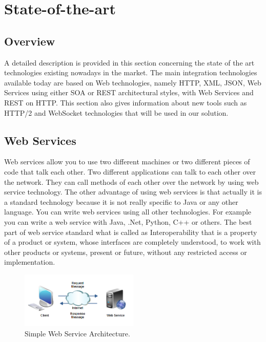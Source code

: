 \chapter{State-of-the-art}
\label{chapter:stateofart}

\section{Overview}
\label{section:overview}
A detailed description is provided in this section concerning the state of the art technologies existing nowadays in the market.  The main integration technologies available today are based on Web technologies, namely HTTP, XML, JSON, Web Services using either SOA or REST architectural styles, with Web Services and REST on HTTP. This section also gives information about new tools such as HTTP/2 and WebSocket technologies that will be used in our solution.
\section{Web Services}
\label{section:webservices}

Web services allow you to use two different machines or two different pieces of code that talk each other. Two different applications can talk to each other over the network. They can call methods of each other over the network by using web service technology. The other advantage of using web services is that actually it is a standard technology because it is not really specific to Java or any other language. You can write web services using all other technologies. For example you can write a web service with Java, .Net, Python, C++ or others. The best part of web service standard what is called as Interoperability that  is a property of a product or system, whose interfaces are completely understood, to work with other products or systems, present or future, without any restricted access or implementation\citep{thesis:state1}.

\begin{figure}[!htb]
  \centering
  \includegraphics[width=0.5\textwidth]{Figures/web-service-message-formats-1.png}
  \caption[Simple Web Service Architecture.]{Simple Web Service Architecture.}
  \label{fig:webservice}
\end{figure}

